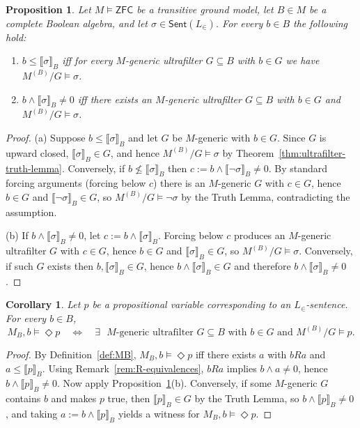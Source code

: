 \documentclass[11pt]{amsart}
\theoremstyle{definition}
\theoremstyle{plain}
\newtheorem{proposition}[definition]{Proposition}
\newtheorem{corollary}[definition]{Corollary}
\newcommand{\Sent}{\mathsf{Sent}}
\newcommand{\LP}{L_{\in}} %
\newcommand{\val}[1]{\llbracket #1\rrbracket_B}
\begin{document}
\begin{proposition}\label{prop:boolean-forcing}
Let $M\models\mathsf{ZFC}$ be a transitive ground model, let $B\in M$ be a complete Boolean algebra,
and let $\sigma\in\Sent(\LP)$.
For every $b\in B$ the following hold:
\begin{enumerate}[label=(\alph*)]
\item $b\le \val{\sigma}$ iff for every $M$-generic ultrafilter $G\subseteq B$ with $b\in G$ we have
$M^{(B)}/G\models \sigma$.
\item $b\wedge \val{\sigma}\neq 0$ iff there exists an $M$-generic ultrafilter $G\subseteq B$ with
$b\in G$ and $M^{(B)}/G\models \sigma$.
\end{enumerate}
\end{proposition}

\begin{proof}
(a) Suppose $b\le \val{\sigma}$ and let $G$ be $M$-generic with $b\in G$. Since $G$ is upward closed,
$\val{\sigma}\in G$, and hence $M^{(B)}/G\models \sigma$ by Theorem~\ref{thm:ultrafilter-truth-lemma}.
Conversely, if $b\not\le \val{\sigma}$ then $c:=b\wedge \val{\neg\sigma}\neq 0$. By standard forcing
arguments (forcing below $c$) there is an $M$-generic $G$ with $c\in G$, hence $b\in G$ and
$\val{\neg\sigma}\in G$, so $M^{(B)}/G\models\neg\sigma$ by the Truth Lemma, contradicting the
assumption.

(b) If $b\wedge \val{\sigma}\neq 0$, let $c:=b\wedge \val{\sigma}$. Forcing below $c$ produces an
$M$-generic ultrafilter $G$ with $c\in G$, hence $b\in G$ and $\val{\sigma}\in G$, so
$M^{(B)}/G\models\sigma$. Conversely, if such $G$ exists then $b,\val{\sigma}\in G$, hence
$b\wedge \val{\sigma}\in G$ and therefore $b\wedge \val{\sigma}\neq 0$.
\end{proof}

\begin{corollary}\label{cor:atomic-forceability}
Let $p$ be a propositional variable corresponding to an $L_{\in}$-sentence.
For every $b\in B$,
\[
M_B,b\models \Diamond p
\quad\Longleftrightarrow\quad
\exists\text{ $M$-generic ultrafilter $G\subseteq B$ with $b\in G$ and }M^{(B)}/G\models p.
\]
\end{corollary}

\begin{proof}
By Definition~\ref{def:MB}, $M_B,b\models \Diamond p$ iff there exists $a$ with $bRa$ and
$a\le\val{p}$. Using Remark~\ref{rem:R-equivalences}, $bRa$ implies $b\wedge a\neq 0$, hence
$b\wedge \val{p}\neq 0$. Now apply Proposition~\ref{prop:boolean-forcing}(b).
Conversely, if some $M$-generic $G$ contains $b$ and makes $p$ true, then $\val{p}\in G$ by the Truth
Lemma, so $b\wedge \val{p}\neq 0$, and taking $a:=b\wedge \val{p}$ yields a witness for
$M_B,b\models\Diamond p$.
\end{proof}
\end{document}

